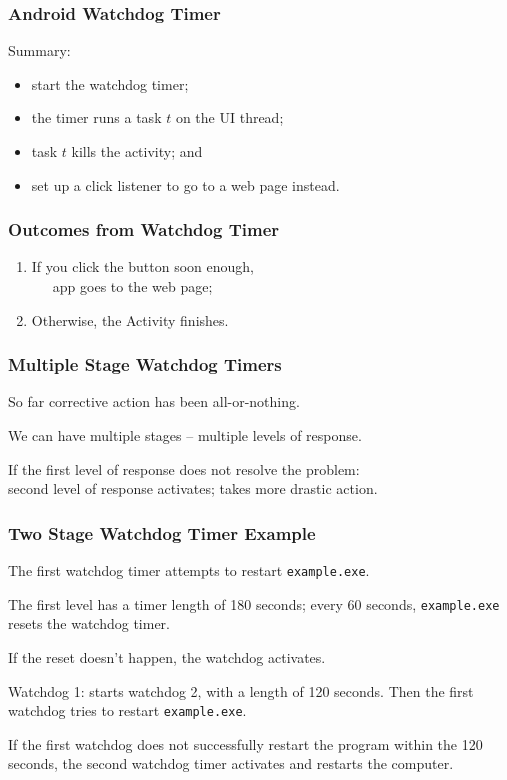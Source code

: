 \begin{frame}
\frametitle{Android Watchdog Timer}

\begin{changemargin}{1cm}
\large
Summary: 
\begin{itemize} 
\item start the watchdog timer;
\item the timer runs a task $t$ on the UI thread;
\item task $t$ kills the activity; and
\item set up a click listener to go to a web page instead.
\end{itemize}
\end{changemargin}
\end{frame}

\begin{frame}
\frametitle{Outcomes from Watchdog Timer}
\begin{changemargin}{1cm}
\Large
\begin{enumerate}
\item If you click the button soon enough, \\
~~~app goes to the web page;
\item Otherwise, the Activity finishes.
\end{enumerate}
\end{changemargin}
\end{frame}

\begin{frame}
\frametitle{Multiple Stage Watchdog Timers}
\begin{changemargin}{1cm}
So far corrective action has been all-or-nothing. 

We can have multiple stages -- multiple levels of response. 

If the first level of response does not resolve the problem: \\
\quad second level of response activates; takes more drastic action. 


\end{changemargin}
\end{frame}

\begin{frame}
\frametitle{Two Stage Watchdog Timer Example}
\begin{changemargin}{1cm}

The first watchdog timer attempts to restart \texttt{example.exe}. 

The first level has a timer length of 180 seconds; every 60 seconds, \texttt{example.exe} resets the watchdog timer. 

If the reset doesn't happen, the watchdog activates. 

Watchdog 1: starts watchdog 2, with a length of 120 seconds. Then the first watchdog tries to restart \texttt{example.exe}. 

If the first watchdog does not successfully restart the program within the 120 seconds, the second watchdog timer activates and restarts the computer.


\end{changemargin}
\end{frame}

